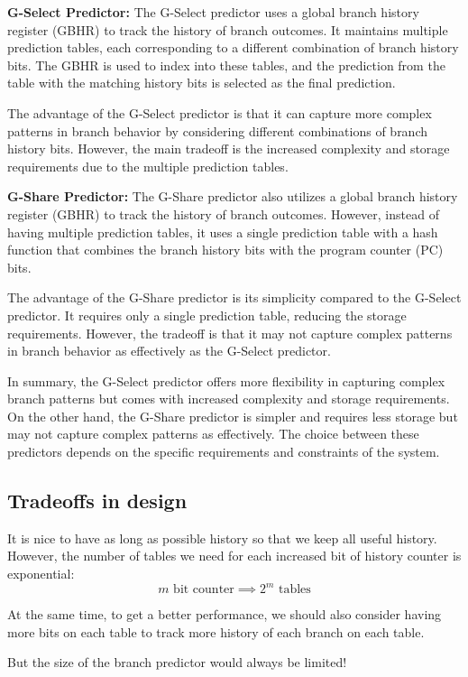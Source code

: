 \documentclass[letterpaper,12pt]{article}
\begin{document}
\textbf{G-Select Predictor:} The G-Select predictor uses a global branch history register (GBHR) to track the history of branch outcomes. It maintains multiple prediction tables, each corresponding to a different combination of branch history bits. The GBHR is used to index into these tables, and the prediction from the table with the matching history bits is selected as the final prediction.

The advantage of the G-Select predictor is that it can capture more complex patterns in branch behavior by considering different combinations of branch history bits. However, the main tradeoff is the increased complexity and storage requirements due to the multiple prediction tables.

\textbf{G-Share Predictor:} The G-Share predictor also utilizes a global branch history register (GBHR) to track the history of branch outcomes. However, instead of having multiple prediction tables, it uses a single prediction table with a hash function that combines the branch history bits with the program counter (PC) bits.

The advantage of the G-Share predictor is its simplicity compared to the G-Select predictor. It requires only a single prediction table, reducing the storage requirements. However, the tradeoff is that it may not capture complex patterns in branch behavior as effectively as the G-Select predictor.

In summary, the G-Select predictor offers more flexibility in capturing complex branch patterns but comes with increased complexity and storage requirements. On the other hand, the G-Share predictor is simpler and requires less storage but may not capture complex patterns as effectively. The choice between these predictors depends on the specific requirements and constraints of the system.
\subsection{Tradeoffs in design}
It is nice to have as long as possible history so that we keep all useful history. However, the number of tables we need for each increased bit of history counter is exponential:
\[m\text{ bit counter}\implies 2^m \text{ tables}\]

At the same time, to get a better performance, we should also consider having more bits on each table to track more history of each branch on each table.

But the size of the branch predictor would always be limited!
\end{document}
